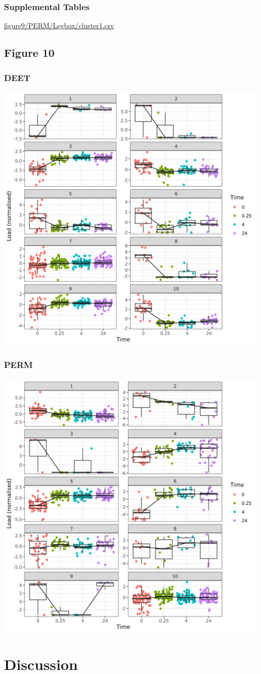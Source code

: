 \documentclass[11pt]{article}
\begin{document}
\subsubsection{Supplemental Tables}
\label{sec:orgcce9fb5}
\url{figure9/PERM/Legbox/cluster1.csv}
\subsection{Figure 10}
\label{sec:org7508fe2}
\subsubsection{DEET}
\label{sec:orgfaa377a}
\begin{center}
\includegraphics[width=.9\linewidth]{figure10/DEET/Bodybox.png}
\end{center}
\subsubsection{PERM}
\label{sec:org1667a82}
\begin{center}
\includegraphics[width=.9\linewidth]{figure10/PERM/Bodybox.png}
\end{center}

\section{Discussion}
\label{sec:org9f24c09}
\end{document}
